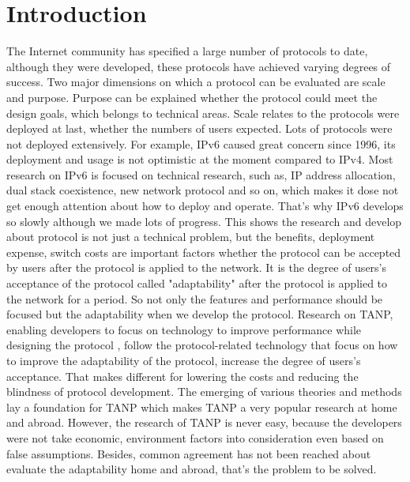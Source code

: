 \documentclass{article}
\begin{document}
\section{Introduction}
The Internet community has specified a large number of protocols to date, although they were developed, these protocols have achieved varying degrees of success. Two major dimensions on which a protocol can be evaluated are scale and purpose. Purpose can be explained whether the protocol could meet the design goals, which belongs to technical areas. Scale relates to the protocols were deployed at last, whether the numbers of users expected. Lots of protocols were not deployed  extensively. For example, IPv6 caused great concern since 1996, its deployment and usage is not optimistic at the moment compared to IPv4.  Most research on IPv6 is focused on technical research, such as, IP address allocation, dual stack coexistence, new network protocol and so on, which makes it dose not get enough attention about how to deploy and operate. That's why IPv6 develops so slowly although we made lots of progress.  This shows the research and develop about protocol is not just a technical problem, but the benefits, deployment expense, switch costs are important factors whether the protocol can be accepted by users after the protocol is applied to the network. It is the degree of users's acceptance of the protocol called "adaptability" after the protocol is applied to the network for a period. So not only the features and performance should be focused but the adaptability when we develop the protocol. Research on TANP, enabling developers to focus on technology to improve performance while designing the protocol , follow the protocol-related technology that focus on how to improve the adaptability of the protocol, increase the degree of users's acceptance. That makes different for lowering the costs and reducing the blindness of protocol development.  The emerging of various theories and methods lay a foundation for TANP which makes  TANP a very popular research at home and abroad. However,  the research of TANP is never easy, because the developers were not take economic, environment factors into consideration even based on false assumptions. Besides, common agreement has not been reached about evaluate the adaptability home and abroad, that's the problem to be solved.
\end{document}
